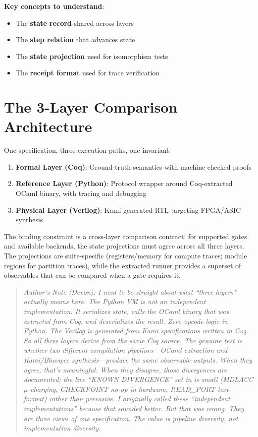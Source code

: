 \textbf{Key concepts to understand}:
\begin{itemize}
    \item The \textbf{state record} shared across layers
    \item The \textbf{step relation} that advances state
    \item The \textbf{state projection} used for isomorphism tests
    \item The \textbf{receipt format} used for trace verification
\end{itemize}

\section{The 3-Layer Comparison Architecture}

One specification, three execution paths, one invariant:
\begin{enumerate}
    \item \textbf{Formal Layer (Coq)}: Ground-truth semantics with machine-checked proofs
    \item \textbf{Reference Layer (Python)}: Protocol wrapper around Coq-extracted OCaml binary, with tracing and debugging
    \item \textbf{Physical Layer (Verilog)}: Kami-generated RTL targeting FPGA/ASIC synthesis
\end{enumerate}

The binding constraint is a cross-layer comparison contract: for supported gates and available backends, the state projections must agree across all three layers. The projections are suite-specific (registers/memory for compute traces; module regions for partition traces), while the extracted runner provides a superset of observables that can be compared when a gate requires it.

\begin{quote}
\textit{Author's Note (Devon): I need to be straight about what ``three layers'' actually means here. The Python VM is not an independent implementation. It serializes state, calls the OCaml binary that was extracted from Coq, and deserializes the result. Zero opcode logic in Python. The Verilog is generated from Kami specifications written in Coq. So all three layers derive from the same Coq source. The genuine test is whether two different compilation pipelines---OCaml extraction and Kami/Bluespec synthesis---produce the same observable outputs. When they agree, that's meaningful. When they disagree, those divergences are documented; the live ``KNOWN DIVERGENCE'' set in  is small (MDLACC $\mu$-charging, CHECKPOINT no-op in hardware, READ\_PORT text-format) rather than pervasive. I originally called these ``independent implementations'' because that sounded better. But that was wrong. They are three views of one specification. The value is pipeline diversity, not implementation diversity.}
\end{quote}

